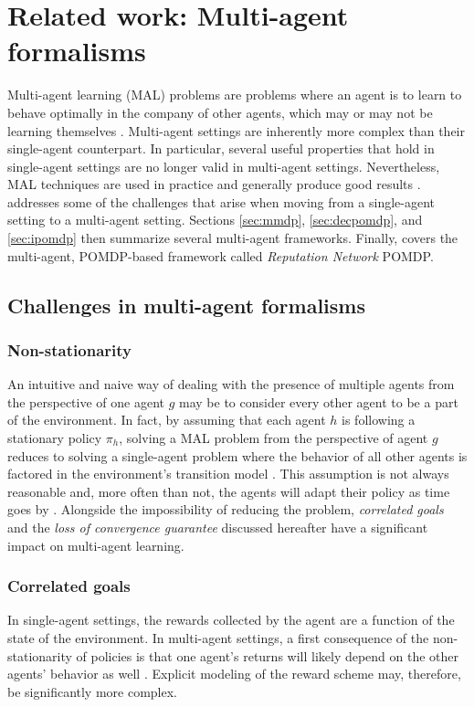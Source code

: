 
\chapter{Related work: Multi-agent formalisms}
\label{chap:related}
Multi-agent learning (MAL) problems are problems where an agent is to learn to behave optimally in the company of other agents, which may or may not be learning themselves \cite{Tuyls_Weiss_2012}.
Multi-agent settings are inherently more complex than their single-agent counterpart. In particular, several useful properties that hold in single-agent settings are no longer valid in multi-agent settings. Nevertheless, MAL techniques are used in practice and generally produce good results \cite{fundamentallymoredifficult}.  addresses some of the challenges that arise when moving from a single-agent setting to a multi-agent setting. Sections \ref{sec:mmdp}, \ref{sec:decpomdp}, and \ref{sec:ipomdp} then summarize several multi-agent frameworks. Finally,  covers the multi-agent, POMDP-based framework called \textit{Reputation Network} POMDP.
\section{Challenges in multi-agent formalisms}
\label{sec:additional}
\subsection{Non-stationarity}
An intuitive and naive way of dealing with the presence of multiple agents from the perspective of one agent $g$ may be to consider every other agent to be a part of the environment. In fact, by assuming that each agent $h$ is following a stationary policy $\pi_h$, solving a MAL problem from the perspective of agent $g$ reduces to solving a single-agent problem where the behavior of all other agents is factored in the environment's transition model \cite{reduce, reduce2}. This assumption is not always reasonable and, more often than not, the agents will adapt their policy as time goes by \cite{nonstation}. Alongside the impossibility of reducing the problem, \textit{correlated goals} and the \textit{loss of convergence guarantee} discussed hereafter have a significant impact on multi-agent learning.

\subsection{Correlated goals}
In single-agent settings, the rewards collected by the agent are a function of the state of the environment. In multi-agent settings, a first consequence of the non-stationarity of policies is that one agent's returns will likely depend on the other agents' behavior as well \cite{nonstation}. Explicit modeling of the reward scheme may, therefore, be significantly more complex.

